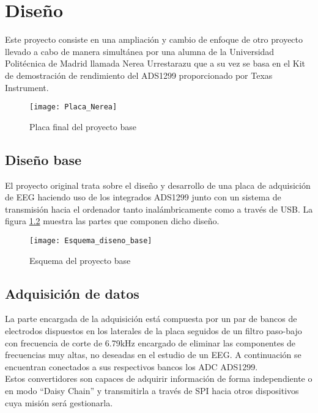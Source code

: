 \chapter{Diseño\label{sec:diseño}}

Este proyecto \cite{Cano} consiste en una ampliación y cambio de enfoque de otro proyecto llevado a cabo de manera simultánea por una alumna de la Universidad Politécnica de Madrid llamada Nerea Urrestarazu que a su vez se basa en el Kit de demostración de rendimiento del ADS1299 proporcionado por Texas Instrument.

\begin{figure} [h]
    \centering
    \texttt{[image: Placa\_Nerea]}
    \caption{Placa final del proyecto base}
    \label{fig:Placa_base}
\end{figure}

\section{Diseño base\label{sec:Diseno_base_N}}

El proyecto original trata sobre el diseño y desarrollo de una placa de adquisición de EEG haciendo uso de los integrados ADS1299 junto con un sistema de transmisión hacia el ordenador tanto inalámbricamente como a través de USB. La figura \ref{fig:Diseno_base} muestra las partes que componen dicho diseño.

\begin{figure} [h]
    \centering
    \texttt{[image: Esquema\_diseno\_base]}
    \caption{Esquema del proyecto base}
    \label{fig:Diseno_base}
\end{figure}

\section{Adquisición de datos\label{sec:Adquisicion_N}}

La parte encargada de la adquisición está compuesta por un par de bancos de electrodos dispuestos en los laterales de la placa seguidos de un filtro paso-bajo con frecuencia de corte de 6.79kHz encargado de eliminar las componentes de frecuencias muy altas, no deseadas en el estudio de un \acrshort{EEG}. A continuación se encuentran conectados a sus respectivos bancos los \acrshort{ADC} ADS1299. 
\\Estos convertidores son capaces de adquirir información de forma independiente o en modo ``Daisy Chain'' y transmitirla a través de \acrshort{SPI} hacia otros dispositivos cuya misión será gestionarla.

